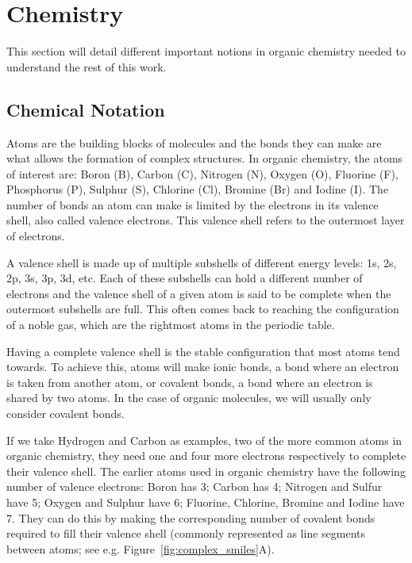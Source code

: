 \documentclass[../Document.tex]{subfiles}
\begin{document}
\section{Chemistry}
\label{sec:intro/chemistry}
This section will detail different important notions in organic chemistry needed to understand the rest of this work.


\subsection{Chemical Notation}
Atoms are the building blocks of molecules and the bonds they can make are what allows the formation of complex structures. In organic chemistry, the atoms of interest are: Boron (B), Carbon (C), Nitrogen (N), Oxygen (O), Fluorine (F), Phosphorus (P), Sulphur (S), Chlorine (Cl), Bromine (Br) and Iodine (I).
The number of bonds an atom can make is limited by the electrons in its valence shell, also called valence electrons. This valence shell refers to the outermost layer of electrons.

A valence shell is made up of multiple subshells of different energy levels: 1s, 2s, 2p, 3s, 3p, 3d, etc. Each of these subshells can hold a different number of electrons and the valence shell of a given atom is said to be complete when the outermost subshells are full. This often comes back to reaching the configuration of a noble gas, which are the rightmost atoms in the periodic table.

Having a complete valence shell is the stable configuration that most atoms tend towards. To achieve this, atoms will make ionic bonds, a bond where an electron is taken from another atom, or covalent bonds, a bond where an electron is shared by two atoms. In the case of organic molecules, we will usually only consider covalent bonds.

If we take Hydrogen and Carbon as examples, two of the more common atoms in organic chemistry, they need one and four more electrons respectively to complete their valence shell. The earlier atoms used in organic chemistry have the following number of valence electrons: Boron has 3; Carbon has 4; Nitrogen and Sulfur have 5; Oxygen and Sulphur have 6; Fluorine, Chlorine, Bromine and Iodine have 7.
They can do this by making the corresponding number of covalent bonds required to fill their valence shell (commonly represented as line segments between atoms; see e.g. Figure~\ref{fig:complex_smiles}A).
\end{document}
